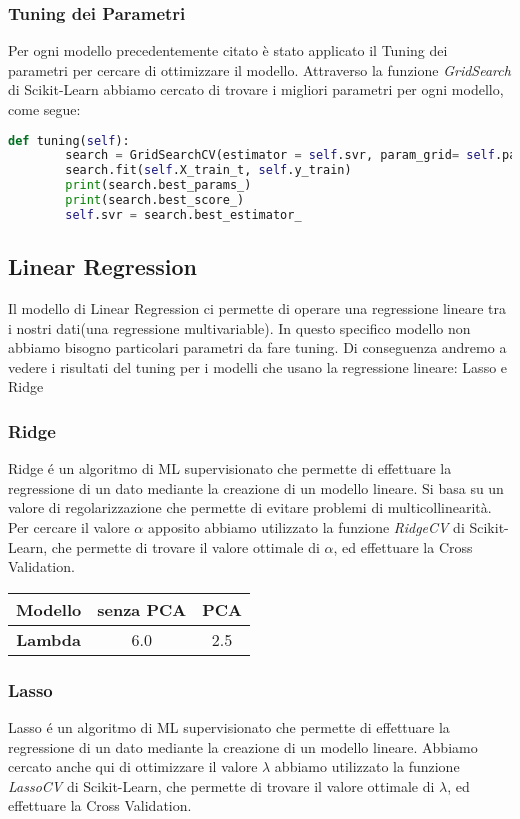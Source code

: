 \documentclass[../../Report.tex]{subfiles}
\begin{document}
\subsubsection{Tuning dei Parametri}
Per ogni modello precedentemente citato è stato applicato il Tuning dei parametri per cercare di ottimizzare il modello.
Attraverso la funzione \textit{GridSearch} di Scikit-Learn abbiamo cercato di trovare i migliori parametri per ogni modello, come segue:
\begin{lstlisting}[language=Python]
    def tuning(self):
        search = GridSearchCV(estimator = self.svr, param_grid= self.params, cv = 3, n_jobs = 6)
        search.fit(self.X_train_t, self.y_train)
        print(search.best_params_)
        print(search.best_score_)
        self.svr = search.best_estimator_
\end{lstlisting}
\subsection{Linear Regression}
Il modello di Linear Regression ci permette di operare una regressione lineare tra i nostri dati(una regressione multivariable).
In questo specifico modello non abbiamo bisogno particolari parametri da fare tuning.
Di conseguenza andremo a vedere i risultati del tuning per i modelli che usano la regressione lineare: Lasso e Ridge
\subsubsection{Ridge}
Ridge é un algoritmo di ML supervisionato che permette di effettuare la regressione di un dato mediante la creazione di un modello lineare.
Si basa su un valore di regolarizzazione che permette di evitare problemi di multicollinearità.
Per cercare il valore $\alpha$ apposito abbiamo utilizzato la funzione \textit{RidgeCV} di Scikit-Learn, che permette di trovare il valore ottimale di $\alpha$, ed effettuare la Cross Validation.

\begin{table}[h]
    \centering
    \begin{tabular}{|c|c|c|}
    \hline
\textbf{Modello} & \textbf{senza PCA} & \textbf{PCA} \\ \hline
\textbf{Lambda} & 6.0 & 2.5\\ \hline
\end{tabular}
\end{table}


\subsubsection{Lasso}
Lasso é un algoritmo di ML supervisionato che permette di effettuare la regressione di un dato mediante la creazione di un modello lineare.
Abbiamo cercato anche qui di ottimizzare il valore $\lambda$ abbiamo utilizzato la funzione \textit{LassoCV} di Scikit-Learn, che permette di trovare il valore ottimale di $\lambda$, ed effettuare la Cross Validation.
\end{document}
